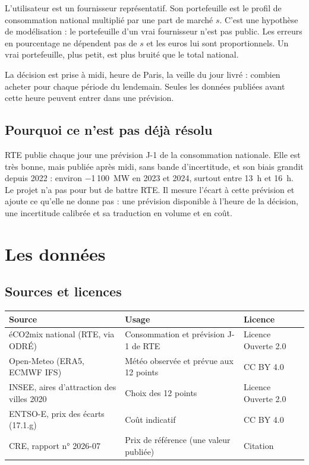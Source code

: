 \documentclass[11pt,a4paper]{article}
\begin{document}
L'utilisateur est un fournisseur représentatif. Son portefeuille est le profil de consommation national multiplié par une part de marché $s$. C'est une hypothèse de modélisation : le portefeuille d'un vrai fournisseur n'est pas public. Les erreurs en pourcentage ne dépendent pas de $s$ et les euros lui sont proportionnels. Un vrai portefeuille, plus petit, est plus bruité que le total national.

La décision est prise à midi, heure de Paris, la veille du jour livré : combien acheter pour chaque période du lendemain. Seules les données publiées avant cette heure peuvent entrer dans une prévision.

\subsection{Pourquoi ce n'est pas déjà résolu}

RTE publie chaque jour une prévision J-1 de la consommation nationale. Elle est très bonne, mais publiée après midi, sans bande d'incertitude, et son biais grandit depuis 2022 : environ −1\,100~MW en 2023 et 2024, surtout entre 13~h et 16~h. Le projet n'a pas pour but de battre RTE. Il mesure l'écart à cette prévision et ajoute ce qu'elle ne donne pas : une prévision disponible à l'heure de la décision, une incertitude calibrée et sa traduction en volume et en coût.

\section{Les données}

\subsection{Sources et licences}

\begin{table}[H]
\small
\begin{tabularx}{\linewidth}{lYl}
\toprule
\textbf{Source} & \textbf{Usage} & \textbf{Licence} \\
\midrule
éCO2mix national (RTE, via ODRÉ) & Consommation et prévision J-1 de RTE & Licence Ouverte 2.0 \\
Open-Meteo (ERA5, ECMWF IFS) & Météo observée et prévue aux 12 points & CC BY 4.0 \\
INSEE, aires d'attraction des villes 2020 & Choix des 12 points & Licence Ouverte 2.0 \\
ENTSO-E, prix des écarts (17.1.g) & Coût indicatif & CC BY 4.0 \\
CRE, rapport n° 2026-07 & Prix de référence (une valeur publiée) & Citation \\
\bottomrule
\end{tabularx}
\end{table}
\end{document}
